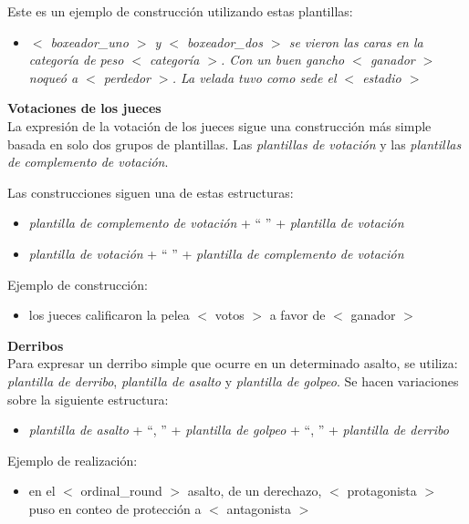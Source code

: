    Este es un ejemplo de construcción utilizando estas plantillas:
    \begin{itemize}
        \item \textit{$<$ boxeador\_uno $>$ y $<$ boxeador\_dos $>$ se vieron las caras en la categoría de peso $<$ categoría $>$. Con un buen 
        gancho $<$ ganador $>$ noqueó a $<$ perdedor $>$. La velada tuvo como sede el $<$ estadio $>$}
    \end{itemize}


    \textbf{Votaciones de los jueces}\\

    La expresión de la votación de los jueces sigue una construcción más simple basada en solo dos grupos de plantillas. 
Las \textit{plantillas de votación} y las \textit{plantillas de complemento de votación}.
    
    Las construcciones siguen una de estas estructuras:
    \begin{itemize}
        \item \textit{plantilla de complemento de votación} + “ ” + \textit{plantilla de votación}
        \item \textit{plantilla de votación} + “ ” + \textit{plantilla de complemento de votación}
    \end{itemize}

    Ejemplo de construcción:
    \begin{itemize}
        \item los jueces calificaron la pelea $<$ votos $>$ a favor de $<$ ganador $>$
    \end{itemize}



    \textbf{Derribos}\\

    Para expresar un derribo simple que ocurre en un determinado asalto, se utiliza: \textit{plantilla de derribo}, 
    \textit{plantilla de asalto} y \textit{plantilla de golpeo}. Se hacen variaciones sobre la siguiente estructura:
    \begin{itemize}
        \item \textit{plantilla de asalto} + “, ” + \textit{plantilla de golpeo} + “, ” + \textit{plantilla de derribo}
    \end{itemize}
    Ejemplo de realización:
    \begin{itemize}
        \item en el $<$ ordinal\_round $>$ asalto, de un derechazo, $<$ protagonista $>$ puso en conteo de protección a $<$ antagonista $>$
    \end{itemize}

